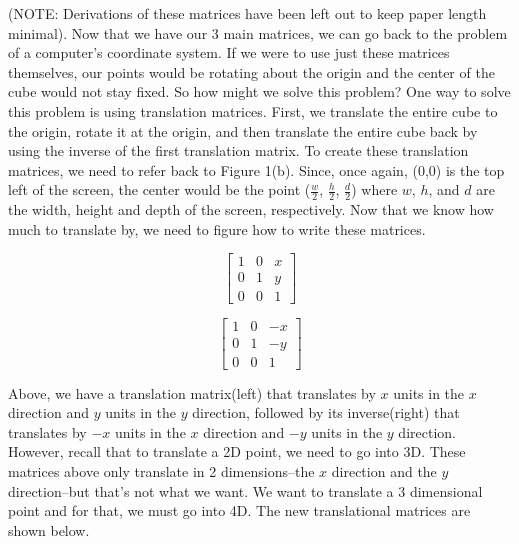 \documentclass[14pt]{article}
\begin{document}
(NOTE: Derivations of these 	matrices have been left out to keep paper length minimal). Now that we have our 3 main matrices, we can go back to the problem of a computer's coordinate system. If we were to use just these matrices themselves, our points would be rotating about the origin and the center of the cube would not stay fixed. So how might we solve this problem? One way to solve this problem is using translation matrices. First, we translate the entire cube to the origin, rotate it at the origin, and then translate the entire cube back by using the inverse of the first translation matrix. To create these translation matrices, we need to refer back to Figure 1(b). Since, once again, (0,0) is the top left of the screen, the center would be the point ($\frac{w}{2}$, $\frac{h}{2}$, $\frac{d}{2}$) where $w$, $h$, and $d$ are the width, height and depth of the screen, respectively. Now that we know how much to translate by, we need to figure how to write these matrices.

\begin{figure}[h]
	\vspace*{1em}
	\begin{center}
		\begin{minipage}[b]{0.45\textwidth}
			\centering
			
			$$
			\begin{bmatrix}
			1 & 0 & x \\
			0 & 1 & y \\ 
			0 & 0 & 1
			\end{bmatrix}
			$$
		\end{minipage}
		\hfill
		\begin{minipage}[b]{0.45\textwidth}
			\centering
			$$
			\begin{bmatrix}
			1 & 0 & -x \\
			0 & 1 & -y \\ 
			0 & 0 & 1
			\end{bmatrix}			
			$$
		\end{minipage}
	\end{center}
	\vspace*{1em}
\end{figure}

Above, we have a translation matrix(left) that translates by $x$ units in the $x$ direction and $y$ units in the $y$ direction, followed by its inverse(right) that translates by $-x$ units in the $x$ direction and $-y$ units in the $y$ direction. However, recall that to translate a 2D point, we need to go into 3D. These matrices above only translate in 2 dimensions--the $x$ direction and the $y$ direction--but that's not what we want. We want to translate a 3 dimensional point and for that, we must go into 4D. The new translational matrices are shown below.
\end{document}
